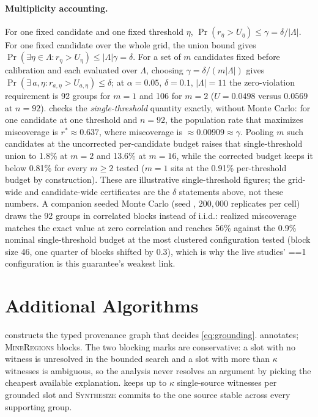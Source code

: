 \paragraph{Multiplicity accounting.} For one fixed candidate and one fixed
threshold $\eta$, $\Pr(r_\eta>U_\eta)\le\gamma=\delta/|\Lambda|$. For one fixed
candidate over the whole grid, the union bound gives
$\Pr(\exists\eta\in\Lambda:r_\eta>U_\eta)\le|\Lambda|\gamma=\delta$. For a set
of $m$ candidates fixed before calibration and each evaluated over $\Lambda$,
choosing $\gamma=\delta/(m|\Lambda|)$ gives
$\Pr(\exists\,a,\eta: r_{a,\eta}>U_{a,\eta})\le\delta$; at $\alpha=0.05$,
$\delta=0.1$, $|\Lambda|=11$ the zero-violation requirement is 92 groups for
$m=1$ and 106 for $m=2$ ($U=0.0498$ versus $0.0569$ at $n=92$).
 checks the
\emph{single-threshold} quantity exactly, without Monte Carlo: for one candidate
at one threshold and $n=92$, the population rate that maximizes miscoverage is
$r^{*}\approx0.637$, where miscoverage is $\approx0.00909\approx\gamma$. Pooling
$m$ such candidates at the uncorrected per-candidate budget raises that
single-threshold union to 1.8\% at $m=2$ and 13.6\% at $m=16$, while the
corrected budget keeps it below 0.81\% for every $m\ge2$ tested ($m=1$ sits
at the 0.91\% per-threshold budget by construction). These are
illustrative single-threshold figures; the grid-wide and candidate-wide
certificates are the $\delta$ statements above, not these numbers. A companion
seeded Monte Carlo (seed , $200{,}000$ replicates per cell) draws
the 92 groups in correlated blocks instead of i.i.d.: realized miscoverage
matches the exact value at zero correlation and reaches 56\% against the 0.9\%
nominal single-threshold budget at the most clustered configuration tested
(block size 46, one quarter of blocks shifted by 0.3), which is why the live
studies' ==1 configuration is this
guarantee's weakest link.

\section{Additional Algorithms}
\label{app:algorithms}





 constructs the typed provenance graph that decides
\cref{eq:grounding}. \patg annotates; \textsc{MineRegions} blocks. The two
blocking marks are conservative: a slot with no witness is unresolved in the
bounded search and a slot with more than $\kappa$ witnesses is ambiguous, so the
analysis never resolves an argument by picking the cheapest available
explanation. \patg keeps up to $\kappa$ single-source witnesses per grounded slot
and \textsc{Synthesize} commits to the one source stable across every supporting
group.

